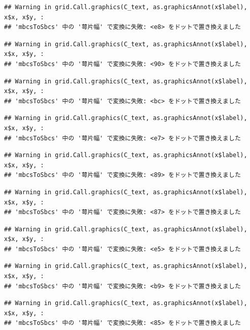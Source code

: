 \documentclass[
]{book}
\begin{document}
\begin{verbatim}
## Warning in grid.Call.graphics(C_text, as.graphicsAnnot(x$label), x$x, x$y, :
## 'mbcsToSbcs' 中の '萼片幅' で変換に失敗: <e8> をドットで置き換えました
\end{verbatim}

\begin{verbatim}
## Warning in grid.Call.graphics(C_text, as.graphicsAnnot(x$label), x$x, x$y, :
## 'mbcsToSbcs' 中の '萼片幅' で変換に失敗: <90> をドットで置き換えました
\end{verbatim}

\begin{verbatim}
## Warning in grid.Call.graphics(C_text, as.graphicsAnnot(x$label), x$x, x$y, :
## 'mbcsToSbcs' 中の '萼片幅' で変換に失敗: <bc> をドットで置き換えました
\end{verbatim}

\begin{verbatim}
## Warning in grid.Call.graphics(C_text, as.graphicsAnnot(x$label), x$x, x$y, :
## 'mbcsToSbcs' 中の '萼片幅' で変換に失敗: <e7> をドットで置き換えました
\end{verbatim}

\begin{verbatim}
## Warning in grid.Call.graphics(C_text, as.graphicsAnnot(x$label), x$x, x$y, :
## 'mbcsToSbcs' 中の '萼片幅' で変換に失敗: <89> をドットで置き換えました
\end{verbatim}

\begin{verbatim}
## Warning in grid.Call.graphics(C_text, as.graphicsAnnot(x$label), x$x, x$y, :
## 'mbcsToSbcs' 中の '萼片幅' で変換に失敗: <87> をドットで置き換えました
\end{verbatim}

\begin{verbatim}
## Warning in grid.Call.graphics(C_text, as.graphicsAnnot(x$label), x$x, x$y, :
## 'mbcsToSbcs' 中の '萼片幅' で変換に失敗: <e5> をドットで置き換えました
\end{verbatim}

\begin{verbatim}
## Warning in grid.Call.graphics(C_text, as.graphicsAnnot(x$label), x$x, x$y, :
## 'mbcsToSbcs' 中の '萼片幅' で変換に失敗: <b9> をドットで置き換えました
\end{verbatim}

\begin{verbatim}
## Warning in grid.Call.graphics(C_text, as.graphicsAnnot(x$label), x$x, x$y, :
## 'mbcsToSbcs' 中の '萼片幅' で変換に失敗: <85> をドットで置き換えました
\end{verbatim}
\end{document}
